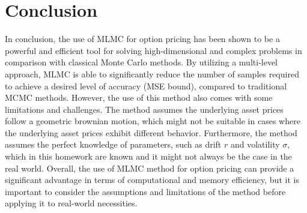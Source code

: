 \section{Conclusion}
In conclusion, the use of MLMC for option pricing has been shown to be a powerful and efficient tool for solving high-dimensional and complex problems in comparison with classical Monte Carlo methods. By utilizing a multi-level approach, MLMC is able to significantly reduce the number of samples required to achieve a desired level of accuracy (MSE bound), compared to traditional MCMC methods.
However, the use of this method also comes with some limitations and challenges. The method assumes the underlying asset prices follow a geometric brownian motion, which might not be suitable in cases where the underlying asset prices exhibit different behavior. Furthermore, the method assumes the perfect knowledge of parameters, such as drift $r$ and volatility $\sigma$, which in this homework are known and it might not always be the case in the real world.
Overall, the use of MLMC method for option pricing can provide a significant advantage in terms of computational and memory efficiency, but it is important to consider the assumptions and limitations of the method before applying it to real-world necessities.




